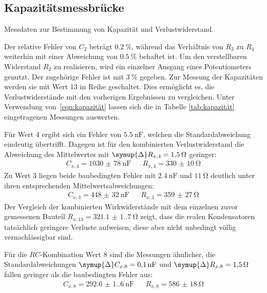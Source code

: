 \subsection{Kapazitätsmessbrücke}

\begin{table}
	\centering
	\caption{Messdaten zur Bestimmung von Kapazität und Verlustwiderstand.}
	
	\label{tab:kapazität}
\end{table}

Der relative Fehler von $C_2$ beträgt $\qty{0.2}{\percent}$, während das Verhältnis von $R_3$ zu $R_4$
weiterhin mit einer Abweichung von $\qty{0.5}{\percent}$ behaftet ist. Um den verstellbaren Widerstand
$R_2$ zu realisieren, wird ein einzelner Ausgang eines Potentiometers genutzt. Der zugehörige Fehler ist
mit $\qty{3}{\percent}$ gegeben. Zur Messung der Kapazitäten werden sie mit Wert 13 {in} Reihe geschaltet.
Dies ermöglicht es, die Verlustwiderstände mit den vorherigen Ergebnissen zu vergleichen. Unter Verwendung
von~\eqref{eqn:kapazität} lassen sich die in Tabelle \ref{tab:kapazität} eingetragenen Messungen auswerten.

Für Wert 4 ergibt sich ein Fehler von $\qty{5.5}{\nano\farad}$, welchen die Standardabweichung
eindeutig übertrifft. Dagegen ist für den kombinierten Verlustwiderstand die Abweichung des Mittelwertes
mit $\symup{\Delta} R_{x,4} = \qty{1.5}{\ohm}$ geringer:
\begin{align*}
	C_{x,4} = \qty{1030(78)}{\nano\farad} && R_{x,4} = \qty{330(10)}{\ohm}
\end{align*}
Zu Wert 3 liegen beide baubedingten Fehler mit $\qty{2.4}{\nano\farad}$ und $\qty{11}{\ohm}$ deutlich
unter ihren entsprechenden Mittelwertsabweichungen:
\begin{align*}
	C_{x,3} = \qty{448(32)}{\nano\farad} &&
	R_{x,3} = \qty{359(27)}{\ohm}
\end{align*}
Der Vergleich der kombinierten Wirkwiderstände mit dem einzelnen zuvor gemessenen Bauteil
$R_{x,13} = \qty{321.1(1.7)}{\ohm}$ zeigt, dass die realen Kondensatoren tatsächlich geringere Verluste
aufweisen, diese aber nicht unbedingt völlig vernachlässigbar sind. 

Für die $RC$-Kombination Wert 8 sind die Messungen ähnlicher, die Standardabweichungen 
$\symup{\Delta} C_{x,8} = \qty{0.1}{\nano\farad}$ und $\symup{\Delta} R_{x,8}= \qty{1.5}{\ohm}$
fallen geringer als die baubedingten Fehler aus:
\begin{align*}
	C_{x,8} = \qty{292.6(1.6)}{\nano\farad} &&
	R_{x,8} = \qty{586(18)}{\ohm}
\end{align*}

